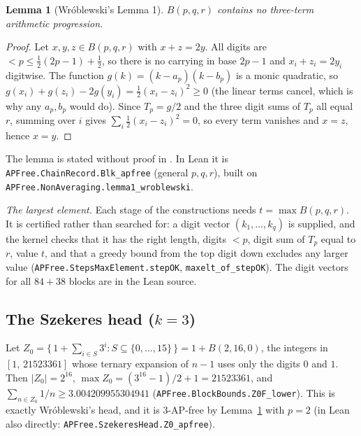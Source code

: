 \documentclass[11pt,a4paper]{article}
\newtheorem{lemma}[theorem]{Lemma}
\theoremstyle{definition}
\theoremstyle{remark}
\newcommand{\Blk}{B}
\newcommand{\code}[1]{\texttt{#1}}
\begin{document}
\begin{lemma}[Wr\'oblewski's Lemma 1]\label{lem:block}
$\Blk(p,q,r)$ contains no three-term arithmetic progression.
\end{lemma}

\begin{proof}
Let $x,y,z\in\Blk(p,q,r)$ with $x+z=2y$. All digits are $<p \le \tfrac12(2p-1)+\tfrac12$, so there is no carrying in base $2p-1$ and $x_i+z_i=2y_i$ digitwise. The function $g(k)=(k-a_p)(k-b_p)$ is a monic quadratic, so $g(x_i)+g(z_i)-2g(y_i)=\tfrac12(x_i-z_i)^2\ge0$ (the linear terms cancel, which is why any $a_p, b_p$ would do). Since $T_p = g/2$ and the three digit sums of $T_p$ all equal $r$, summing over $i$ gives $\sum_i \tfrac12 (x_i - z_i)^2 = 0$, so every term vanishes and $x=z$, hence $x = y$.
\end{proof}

The lemma is stated without proof in \cite{Wr84}. In Lean it is \code{APFree.\allowbreak{}ChainRecord.\allowbreak{}Blk\_\allowbreak{}apfree} (general $p,q,r$), built on \code{APFree.\allowbreak{}NonAveraging.\allowbreak{}lemma1\_\allowbreak{}wroblewski}.

\emph{The largest element.} Each stage of the constructions needs $t = \max \Blk(p,q,r)$. It is certified rather than searched for: a digit vector $(k_1,\dots,k_q)$ is supplied, and the kernel checks that it has the right length, digits $<p$, digit sum of $T_p$ equal to $r$, value $t$, and that a greedy bound from the top digit down excludes any larger value (\code{APFree.\allowbreak{}StepsMaxElement.\allowbreak{}stepOK}, \code{maxelt\_\allowbreak{}of\_\allowbreak{}stepOK}). The digit vectors for all $84 + 38$ blocks are in the Lean source.

\subsection{The Szekeres head (\texorpdfstring{$k = 3$}{k = 3})}\label{sec:szekeres}

Let $Z_0=\{\,1+\sum_{i\in S}3^i : S\subseteq\{0,\dots,15\}\,\} = 1 + \Blk(2,16,0)$, the integers in $[1,\,21523361]$ whose ternary expansion of $n-1$ uses only the digits $0$ and $1$. Then $|Z_0|=2^{16}$, $\max Z_0 = (3^{16}-1)/2+1 = 21523361$, and $\sum_{n\in Z_0}1/n \ge 3.004209955304941$ (\code{APFree.\allowbreak{}BlockBounds.\allowbreak{}Z0F\_\allowbreak{}lower}). This is exactly Wr\'oblewski's head, and it is 3-AP-free by Lemma~\ref{lem:block} with $p=2$ (in Lean also directly: \code{APFree.\allowbreak{}SzekeresHead.\allowbreak{}Z0\_\allowbreak{}apfree}).
\end{document}
